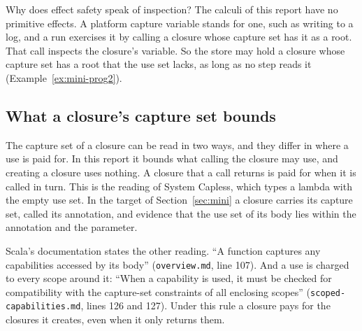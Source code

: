 Why does effect safety speak of inspection? The calculi of this report have no primitive effects. A platform capture variable stands for one, such as writing to a log, and a run exercises it by calling a closure whose capture set has it as a root. That call inspects the closure's variable. So the store may hold a closure whose capture set has a root that the use set lacks, as long as no step reads it (Example~\ref{ex:mini-prog2}).

\subsection{What a closure's capture set bounds}\label{sec:cc-closures}

The capture set of a closure can be read in two ways, and they differ in where a use is paid for. In this report it bounds what calling the closure may use, and creating a closure uses nothing. A closure that a call returns is paid for when it is called in turn. This is the reading of System Capless, which types a lambda with the empty use set. In the target of Section~\ref{sec:mini} a closure carries its capture set, called its annotation, and evidence that the use set of its body lies within the annotation and the parameter.

Scala's documentation states the other reading. ``A function captures any capabilities accessed by its body'' (\texttt{overview.md}, line 107). And a use is charged to every scope around it: ``When a capability is used, it must be checked for compatibility with the capture-set constraints of all enclosing scopes'' (\texttt{scoped-capabilities.md}, lines 126 and 127). Under this rule a closure pays for the closures it creates, even when it only returns them.

